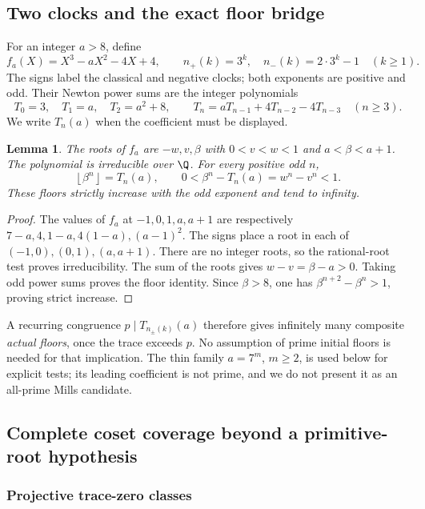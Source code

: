 \documentclass[11pt,a4paper]{article}
\newtheorem{lemma}[theorem]{Lemma}\newtheorem{proposition}[theorem]{Proposition}
\theoremstyle{definition}\newtheorem{definition}[theorem]{Definition}
\theoremstyle{remark}\newtheorem{remark}[theorem]{Remark}
\newcommand{\floor}[1]{\left\lfloor#1\right\rfloor}
\begin{document}
\subsection{Two clocks and the exact floor bridge}

For an integer $a>8$, define
\[
 f_a(X)=X^3-aX^2-4X+4,\qquad
 n_+(k)=3^k,\quad n_-(k)=2\cdot3^k-1\quad(k\ge1).
\]
The signs label the classical and negative clocks; both exponents are
positive and odd. Their Newton power sums are the integer polynomials
\begin{equation}\label{R16:eq:newton}
 T_0=3,\quad T_1=a,\quad T_2=a^2+8,\qquad
 T_n=aT_{n-1}+4T_{n-2}-4T_{n-3}\quad(n\ge3).
\end{equation}
We write $T_n(a)$ when the coefficient must be displayed.

\begin{lemma}\label{R16:lem:floor}
The roots of $f_a$ are $-w,v,\beta$ with
$0<v<w<1$ and $a<\beta<a+1$. The polynomial is irreducible over $\Q$.
For every positive odd $n$,
\[
 \floor{\beta^n}=T_n(a),\qquad
 0<\beta^n-T_n(a)=w^n-v^n<1.
\]
These floors strictly increase with the odd exponent and tend to infinity.
\end{lemma}
\begin{proof}
The values of $f_a$ at $-1,0,1,a,a+1$ are respectively
$7-a,4,1-a,4(1-a),(a-1)^2$. The signs place a root in each of
$(-1,0),(0,1),(a,a+1)$. There are no integer roots, so the rational-root
test proves irreducibility. The sum of the roots gives
$w-v=\beta-a>0$. Taking odd power sums proves the floor identity.
Since $\beta>8$, one has $\beta^{n+2}-\beta^n>1$, proving strict increase.
\end{proof}

A recurring congruence $p\mid T_{n_\pm(k)}(a)$ therefore gives infinitely
many composite \emph{actual floors}, once the trace exceeds $p$. No
assumption of prime initial floors is needed for that implication. The thin
family $a=7^m$, $m\ge2$, is used below for explicit tests; its leading
coefficient is not prime, and we do not present it as an all-prime Mills
candidate.

\subsection{Complete coset coverage beyond a primitive-root hypothesis}

\subsubsection{Projective trace-zero classes}
\end{document}
